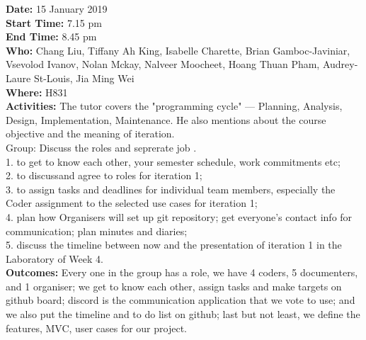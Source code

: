 \documentclass[12pt]{article}
\begin{document}
{\bf Date:} 15 January 2019\\
{\bf Start Time:} 7.15 pm\\
{\bf End Time:} 8.45 pm \\
{\bf Who:} Chang Liu, Tiffany Ah King, Isabelle Charette, Brian Gamboc-Javiniar, Vsevolod Ivanov, Nolan Mckay, Nalveer Moocheet, Hoang Thuan Pham, Audrey-Laure St-Louis, Jia Ming Wei\\
{\bf Where:} H831 \\
{\bf Activities:} The tutor covers the "programming cycle" --- Planning, Analysis, Design, Implementation, Maintenance. He also mentions about the course objective and the meaning of iteration.\\Group: Discuss the roles and seprerate job
\s.\\ 1. to get to know each other, your semester schedule, work commitments etc;\\2. to discussand agree to roles for iteration 1;\\3. to assign tasks and deadlines for individual team members, especially the Coder assignment to the selected use cases for iteration 1;\\4. plan how Organisers will set up git repository; get everyone’s contact info for communication; plan minutes and diaries;\\
5. discuss the timeline between now and the presentation of iteration 1 in the Laboratory of
Week 4.\\
{\bf Outcomes:} Every one in the group has a role, we have 4 coders, 5 documenters, and 1 organiser; we get to know each other, assign tasks and make targets on github board; discord is the communication application that we vote to use; and we also put the timeline and to do list on github; last but not least, we define the features, MVC, user cases for our project.\\\\
\end{document}
